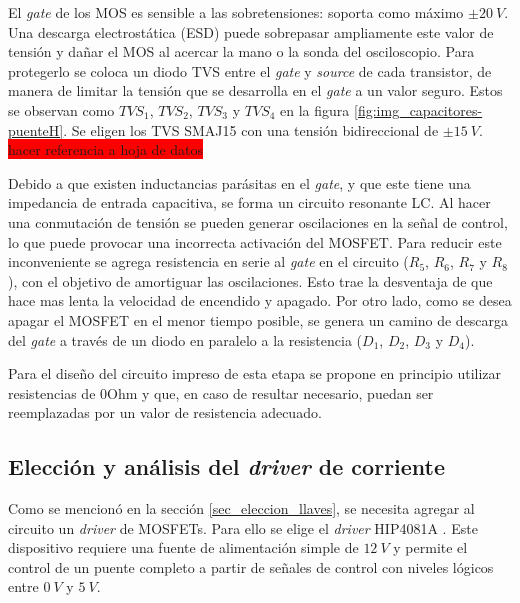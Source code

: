 
\noindent El \textsl{gate} de los MOS es sensible a las sobretensiones: soporta como máximo $\pm 20\:V$. Una descarga electrostática (ESD) puede sobrepasar ampliamente este valor de tensión y dañar el MOS al acercar la mano o la sonda del osciloscopio. Para protegerlo se coloca un diodo TVS entre el \textsl{gate} y \textsl{source} de cada transistor, de manera de limitar la tensión que se desarrolla en el \textsl{gate} a un valor seguro. Estos se observan como $TVS_1$, $TVS_2$, $TVS_3$ y $TVS_4$ en la figura \ref{fig:img_capacitores-puenteH}. Se eligen los TVS SMAJ15 con una tensión bidireccional de $\pm 15\:V$.
\colorbox{red}{hacer referencia a hoja de datos}


Debido a que existen inductancias parásitas en el \textsl{gate}, y que este tiene una impedancia de entrada capacitiva, se forma un circuito resonante LC. Al hacer una conmutación de tensión se pueden generar oscilaciones en la señal de control, lo que puede provocar una incorrecta activación del MOSFET. Para reducir este inconveniente se agrega resistencia en serie al \textsl{gate} en el circuito ($R_5$, $R_6$, $R_7$ y $R_8$), con el objetivo de amortiguar las oscilaciones. Esto trae la desventaja de que hace mas lenta la velocidad de encendido y apagado. Por otro lado, como se desea apagar el MOSFET en el menor tiempo posible, se genera un camino de descarga del \textsl{gate} a través de un diodo en paralelo a la resistencia ($D_1$, $D_2$, $D_3$ y $D_4$).

Para el diseño del circuito impreso de esta etapa se propone en principio utilizar resistencias de 0Ohm y que, en caso de resultar necesario, puedan ser reemplazadas por un valor de resistencia adecuado. 

\subsection{Elección y análisis del \textsl{driver} de corriente}

Como se mencionó en la sección \ref{sec_eleccion_llaves}, se necesita agregar al circuito un \textsl{driver} de MOSFETs. Para ello se elige el \textsl{driver} HIP4081A \cite{HIP4081A_FN3659}. Este dispositivo requiere una fuente de alimentación simple de $12\:V$ y permite el control de un puente completo a partir de señales de control con niveles lógicos entre $0\:V$ y $5\:V$. 

